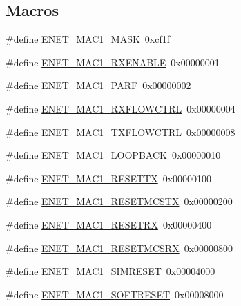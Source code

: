 \subsection*{Macros}
\begin{DoxyCompactItemize}
\item 
\#define \hyperlink{group___e_n_e_t__17_x_x__40_x_x_gadc9dc4a912f946aef0f397e01c745e23}{E\+N\+E\+T\+\_\+\+M\+A\+C1\+\_\+\+M\+A\+S\+K}~0xcf1f
\item 
\#define \hyperlink{group___e_n_e_t__17_x_x__40_x_x_ga1c0b1a53b97bbb37a634729dbb1f7c64}{E\+N\+E\+T\+\_\+\+M\+A\+C1\+\_\+\+R\+X\+E\+N\+A\+B\+L\+E}~0x00000001
\item 
\#define \hyperlink{group___e_n_e_t__17_x_x__40_x_x_ga4c1b1afa07ca17af9a536e55b5214651}{E\+N\+E\+T\+\_\+\+M\+A\+C1\+\_\+\+P\+A\+R\+F}~0x00000002
\item 
\#define \hyperlink{group___e_n_e_t__17_x_x__40_x_x_ga715c51b94b6651715bec8a58d63ede58}{E\+N\+E\+T\+\_\+\+M\+A\+C1\+\_\+\+R\+X\+F\+L\+O\+W\+C\+T\+R\+L}~0x00000004
\item 
\#define \hyperlink{group___e_n_e_t__17_x_x__40_x_x_ga9621f7d3f1df5610f251f74a90d4bfd9}{E\+N\+E\+T\+\_\+\+M\+A\+C1\+\_\+\+T\+X\+F\+L\+O\+W\+C\+T\+R\+L}~0x00000008
\item 
\#define \hyperlink{group___e_n_e_t__17_x_x__40_x_x_ga5d10c874131056c389ecb1357be5e7a2}{E\+N\+E\+T\+\_\+\+M\+A\+C1\+\_\+\+L\+O\+O\+P\+B\+A\+C\+K}~0x00000010
\item 
\#define \hyperlink{group___e_n_e_t__17_x_x__40_x_x_gaf1ab84b82270514182f96bf19db18b38}{E\+N\+E\+T\+\_\+\+M\+A\+C1\+\_\+\+R\+E\+S\+E\+T\+T\+X}~0x00000100
\item 
\#define \hyperlink{group___e_n_e_t__17_x_x__40_x_x_ga929295618f7227006918b172c37274ba}{E\+N\+E\+T\+\_\+\+M\+A\+C1\+\_\+\+R\+E\+S\+E\+T\+M\+C\+S\+T\+X}~0x00000200
\item 
\#define \hyperlink{group___e_n_e_t__17_x_x__40_x_x_ga08220afd93ff8aaee439369cbda83d55}{E\+N\+E\+T\+\_\+\+M\+A\+C1\+\_\+\+R\+E\+S\+E\+T\+R\+X}~0x00000400
\item 
\#define \hyperlink{group___e_n_e_t__17_x_x__40_x_x_gaededc9960450035cfa31578c67d9765a}{E\+N\+E\+T\+\_\+\+M\+A\+C1\+\_\+\+R\+E\+S\+E\+T\+M\+C\+S\+R\+X}~0x00000800
\item 
\#define \hyperlink{group___e_n_e_t__17_x_x__40_x_x_gad1496577c2254ab94911ee01420744ea}{E\+N\+E\+T\+\_\+\+M\+A\+C1\+\_\+\+S\+I\+M\+R\+E\+S\+E\+T}~0x00004000
\item 
\#define \hyperlink{group___e_n_e_t__17_x_x__40_x_x_ga7b0dd5ccbaca44db89764a33f221b225}{E\+N\+E\+T\+\_\+\+M\+A\+C1\+\_\+\+S\+O\+F\+T\+R\+E\+S\+E\+T}~0x00008000

\end{DoxyCompactItemize}
